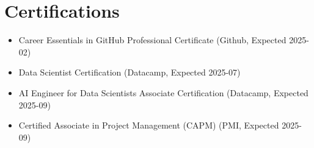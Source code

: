 \documentclass[letterpaper,11pt]{article}
\newcommand{\resumeItem}[1]{
  \item\small{
    {#1 \vspace{-2pt}}
  }
}
\newcommand{\resumeSubHeadingListStart}{\begin{itemize}[leftmargin=0.15in, label={}]}
\newcommand{\resumeSubHeadingListEnd}{\end{itemize}}
\begin{document}
\section{Certifications}
  \resumeSubHeadingListStart
    
    \resumeItem{Career Essentials in GitHub Professional Certificate (Github, Expected 2025-02)}
    
    \resumeItem{Data Scientist Certification (Datacamp, Expected 2025-07)}
    
    \resumeItem{AI Engineer for Data Scientists Associate Certification (Datacamp, Expected 2025-09)}
    
    \resumeItem{Certified Associate in Project Management (CAPM) (PMI, Expected 2025-09)}
    
  \resumeSubHeadingListEnd


\end{document}
